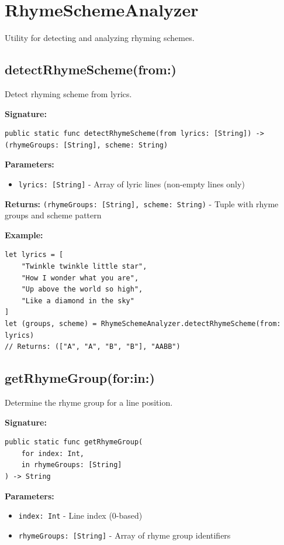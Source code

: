 \documentclass[11pt,a4paper]{article}
\begin{document}
\section{RhymeSchemeAnalyzer}

Utility for detecting and analyzing rhyming schemes.

\subsection{detectRhymeScheme(from:)}

Detect rhyming scheme from lyrics.

\textbf{Signature:}
\begin{lstlisting}
public static func detectRhymeScheme(from lyrics: [String]) -> (rhymeGroups: [String], scheme: String)
\end{lstlisting}

\textbf{Parameters:}
\begin{itemize}
    \item \texttt{lyrics: [String]} - Array of lyric lines (non-empty lines only)
\end{itemize}

\textbf{Returns:} \texttt{(rhymeGroups: [String], scheme: String)} - Tuple with rhyme groups and scheme pattern

\textbf{Example:}
\begin{lstlisting}
let lyrics = [
    "Twinkle twinkle little star",
    "How I wonder what you are",
    "Up above the world so high",
    "Like a diamond in the sky"
]
let (groups, scheme) = RhymeSchemeAnalyzer.detectRhymeScheme(from: lyrics)
// Returns: (["A", "A", "B", "B"], "AABB")
\end{lstlisting}

\subsection{getRhymeGroup(for:in:)}

Determine the rhyme group for a line position.

\textbf{Signature:}
\begin{lstlisting}
public static func getRhymeGroup(
    for index: Int,
    in rhymeGroups: [String]
) -> String
\end{lstlisting}

\textbf{Parameters:}
\begin{itemize}
    \item \texttt{index: Int} - Line index (0-based)
    \item \texttt{rhymeGroups: [String]} - Array of rhyme group identifiers
\end{itemize}
\end{document}
